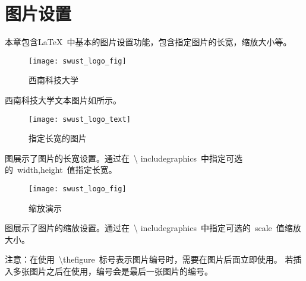 \chapter{图片设置}

本章包含\LaTeX\ 中基本的图片设置功能，包含指定图片的长宽，缩放大小等。

\begin{figure}[ht]
  \centering
  \texttt{[image: swust\_logo\_fig]}
  \caption{西南科技大学}
\end{figure}
西南科技大学文本图片如\thefigure 所示。

\begin{figure}[ht]
  \centering
  \texttt{[image: swust\_logo\_text]}
  \caption{指定长宽的图片}
\end{figure}

图\thefigure 展示了图片的长宽设置。通过在~\textbackslash
includegraphics~中指定可选的~width,height~值指定长宽。

\begin{figure}[ht]
  \centering
  \texttt{[image: swust\_logo\_fig]}
  \caption{缩放演示}
\end{figure}

图\thefigure 展示了图片的缩放设置。通过在~\textbackslash
includegraphics~中指定可选的~scale~值缩放大小。

注意：在使用~\textbackslash thefigure~标号表示图片编号时，需要在图片后面立即使用。
若插入多张图片之后在使用，编号会是最后一张图片的编号。
